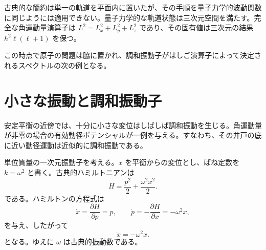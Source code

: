 
古典的な簡約は単一の軌道を平面内に置いたが、その手順を量子力学的波動関数に同じようには適用できない。量子力学的な軌道状態は三次元空間を満たす。完全な角運動量演算子は \(L^2=L_x^2+L_y^2+L_z^2\) であり、その固有値は三次元の結果 \(\hbar^2\ell(\ell+1)\) を保つ。

\begin{classroomqa}
\end{classroomqa}

\begin{classroomqa}
\end{classroomqa}

この時点で原子の問題は脇に置かれ、調和振動子がはしご演算子によって決定されるスペクトルの次の例となる。

\section{小さな振動と調和振動子}

安定平衡の近傍では、十分に小さな変位はしばしば調和振動を生じる。角運動量が非零の場合の有効動径ポテンシャルが一例を与える。すなわち、その井戸の底に近い動径運動は近似的に調和振動である。

単位質量の一次元振動子を考える。\(x\) を平衡からの変位とし、ばね定数を \(k=\omega^2\) と書く。古典的ハミルトニアンは
\begin{equation}
H=\frac{p^2}{2}+\frac{\omega^2x^2}{2}.
\end{equation}
である。ハミルトンの方程式は
\begin{equation}
\dot{x}=\frac{\partial H}{\partial p}=p,
\qquad
\dot{p}=-\frac{\partial H}{\partial x}=-\omega^2x,
\end{equation}
を与え、したがって
\begin{equation}
\ddot{x}=-\omega^2x.
\end{equation}
となる。ゆえに \(\omega\) は古典的振動数である。

